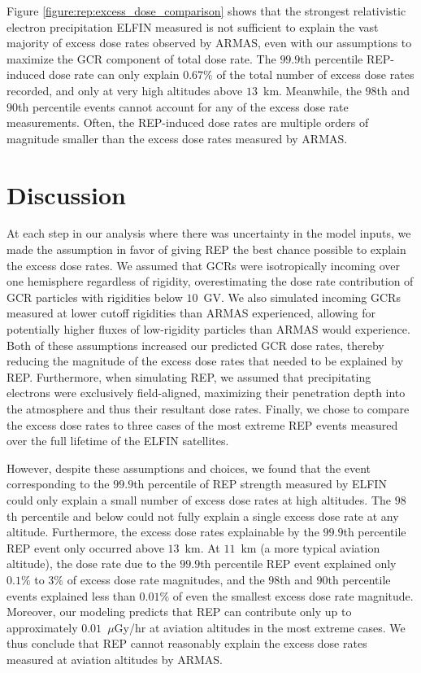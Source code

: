 \documentclass[draft]{agujournal2019}
\newcommand{\ugy}{$\mu$Gy}
\begin{document}
Figure \ref{figure:rep:excess_dose_comparison} shows that the strongest relativistic electron precipitation ELFIN measured is not sufficient to explain the vast majority of excess dose rates observed by ARMAS, even with our assumptions to maximize the GCR component of total dose rate. The $99.9$th percentile REP-induced dose rate can only explain $0.67\%$ of the total number of excess dose rates recorded, and only at very high altitudes above $13$~km. Meanwhile, the $98$th and $90$th percentile events cannot account for any of the excess dose rate measurements. Often, the REP-induced dose rates are multiple orders of magnitude smaller than the excess dose rates measured by ARMAS.

\section{Discussion}
At each step in our analysis where there was uncertainty in the model inputs, we made the assumption in favor of giving REP the best chance possible to explain the excess dose rates. We assumed that GCRs were isotropically incoming over one hemisphere regardless of rigidity, overestimating the dose rate contribution of GCR particles with rigidities below $10$~GV. We also simulated incoming GCRs measured at lower cutoff rigidities than ARMAS experienced, allowing for potentially higher fluxes of low-rigidity particles than ARMAS would experience. Both of these assumptions increased our predicted GCR dose rates, thereby reducing the magnitude of the excess dose rates that needed to be explained by REP. Furthermore, when simulating REP, we assumed that precipitating electrons were exclusively field-aligned, maximizing their penetration depth into the atmosphere and thus their resultant dose rates. Finally, we chose to compare the excess dose rates to three cases of the most extreme REP events measured over the full lifetime of the ELFIN satellites.

However, despite these assumptions and choices, we found that the event corresponding to the $99.9$th percentile of REP strength measured by ELFIN could only explain a small number of excess dose rates at high altitudes. The $98$th percentile and below could not fully explain a single excess dose rate at any altitude. Furthermore, the excess dose rates explainable by the $99.9$th percentile REP event only occurred above $13$~km. At $11$~km (a more typical aviation altitude), the dose rate due to the $99.9$th percentile REP event explained only $0.1\%$ to $3\%$ of excess dose rate magnitudes, and the $98$th and $90$th percentile events explained less than $0.01\%$ of even the smallest excess dose rate magnitude. Moreover, our modeling predicts that REP can contribute only up to approximately $0.01$~{\ugy}/hr at aviation altitudes in the most extreme cases. We thus conclude that REP cannot reasonably explain the excess dose rates measured at aviation altitudes by ARMAS.
\end{document}
